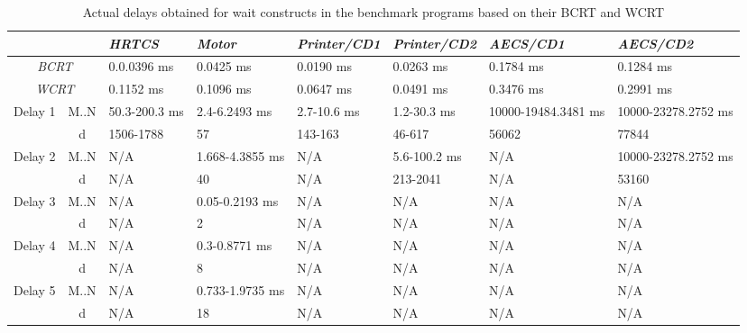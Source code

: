{\renewcommand{\arraystretch}{0.6}
\begin{table*}[t!]
\centering
	\caption{Actual delays obtained for wait constructs in the
benchmark programs based on their BCRT and WCRT}
\begin{tabular}{ c c l l l l l l }
	\toprule
	\multicolumn{2}{c}{} & \emph{HRTCS} & \emph{Motor} & \emph{Printer/CD1} &
	\emph{Printer/CD2} & \emph{AECS/CD1} &	\emph{AECS/CD2} \\ 
	\midrule
	\multicolumn{2}{c}{\emph{BCRT}}	& 0.0.0396 ms	& 0.0425 ms & 0.0190 ms &
	0.0263 ms & 0.1784 ms & 0.1284 ms\\ 
	\cmidrule(r){1-8}
	\multicolumn{2}{c}{\emph{WCRT}} &0.1152 ms & 0.1096 ms & 0.0647 ms
	& 0.0491 ms & 0.3476 ms & 0.2991 ms\\ 
	\cmidrule(r){1-8}

	\multirow{2}{*}{Delay 1} & M..N & 50.3-200.3 ms	& 2.4-6.2493 ms	  &
	2.7-10.6 ms & 1.2-30.3 ms & 10000-19484.3481 ms& 10000-23278.2752 ms \\
	\cmidrule(r){2-8}
	& d &1506-1788 & 57 & 143-163 & 46-617 & 56062 &77844\\ 
	\cmidrule(r){1-8}
	\multirow{2}{*}{Delay 2} & M..N & N/A & 1.668-4.3855 ms & N/A &
	5.6-100.2 ms & N/A &10000-23278.2752 ms\\ 
	\cmidrule(r){2-8}
	& d & N/A & 40 & N/A & 213-2041 & N/A &53160\\ 
	\cmidrule(r){1-8}
	\multirow{2}{*}{Delay 3} & M..N & N/A & 0.05-0.2193 ms & N/A & N/A & N/A
	&N/A\\ 
	\cmidrule(r){2-8}
	& d & N/A & 2 & N/A & N/A & N/A &N/A\\ 
	\cmidrule(r){1-8}
	\multirow{2}{*}{Delay 4} & M..N & N/A & 0.3-0.8771 ms & N/A & N/A & N/A
	&N/A\\ 
	\cmidrule(r){2-8}
	& d & N/A & 8 & N/A & N/A & N/A &N/A\\ 
	\cmidrule(r){1-8}
	\multirow{2}{*}{Delay 5} & M..N & N/A & 0.733-1.9735 ms & N/A & N/A & N/A
	&N/A\\ 
	\cmidrule(r){2-8}
	& d & N/A & 18 & N/A
	& N/A & N/A &N/A\\ \bottomrule
\end{tabular}
\label{fig:comparison}
\end{table*}
}



